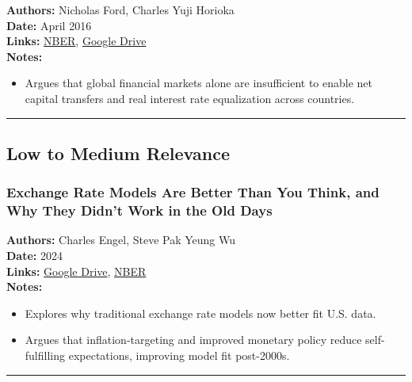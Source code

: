 \documentclass[
  11pt,
]{article}
\providecommand{\tightlist}{%
  \setlength{\itemsep}{0pt}\setlength{\parskip}{0pt}}
\begin{document}
\textbf{Authors:} Nicholas Ford, Charles Yuji Horioka\\
\textbf{Date:} April 2016\\
\textbf{Links:} \href{http://www.nber.org/papers/w22198}{NBER},
\href{https://drive.google.com/file/d/1dIKOGSL5vl_e6A86TPpEyXVHKGyGa3yG/view?usp=sharing}{Google
Drive}\\
\textbf{Notes:}

\begin{itemize}
\tightlist
\item
  Argues that global financial markets alone are insufficient to enable
  net capital transfers and real interest rate equalization across
  countries.
\end{itemize}

\begin{center}\rule{0.5\linewidth}{0.5pt}\end{center}

\subsection{Low to Medium Relevance}\label{low-to-medium-relevance}

\subsubsection{Exchange Rate Models Are Better Than You Think, and Why
They Didn't Work in the Old
Days}\label{exchange-rate-models-are-better-than-you-think-and-why-they-didnt-work-in-the-old-days}

\textbf{Authors:} Charles Engel, Steve Pak Yeung Wu\\
\textbf{Date:} 2024\\
\textbf{Links:}
\href{https://drive.google.com/file/d/1bKyyCi1qhqifzHM9Sx3ahU_tNOCwdYmz/view?usp=sharing}{Google
Drive},
\href{https://www.nber.org/system/files/working_papers/w32808/w32808.pdf}{NBER}\\
\textbf{Notes:}

\begin{itemize}
\tightlist
\item
  Explores why traditional exchange rate models now better fit U.S.
  data.
\item
  Argues that inflation-targeting and improved monetary policy reduce
  self-fulfilling expectations, improving model fit post-2000s.
\end{itemize}

\begin{center}\rule{0.5\linewidth}{0.5pt}\end{center}
\end{document}
